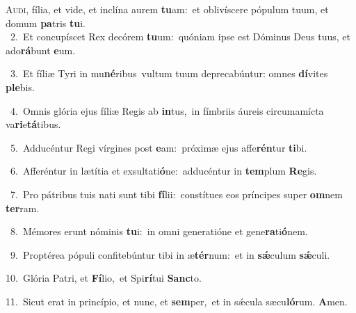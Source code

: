 \lettrine{\initial\textcolor{\initialcolor}{A}}{udi,} fília, et vide, et inclína aurem \textbf{tu}\-am:~\star et oblivíscere pópulum tuum, et domum \textbf{pa}\-tris \textbf{tu}\-i.\\
{\numbfont\textcolor{\numbcolor}{~2.}}~Et concupíscet Rex decórem \textbf{tu}\-um:~\star quóniam ipse est Dóminus Deus tuus, et ado\-\textbf{rá}\-bunt \textbf{e}\-um.\par
{\numbfont\textcolor{\numbcolor}{~3.}}~Et fíliæ Tyri in mu\-\textbf{né}\-ribus~\star vultum tuum deprecabúntur: omnes \textbf{dí}\-vites \textbf{ple}\-bis.\par
{\numbfont\textcolor{\numbcolor}{~4.}}~Omnis glória ejus fíliæ Regis ab \textbf{in}\-tus,~\star in fímbriis áureis circumamícta va\-\textbf{ri}\-e\-\textbf{tá}\-tibus.\par
{\numbfont\textcolor{\numbcolor}{~5.}}~Adducéntur Regi vírgines post \textbf{e}\-am:~\star próximæ ejus affe\-\textbf{rén}\-tur \textbf{ti}\-bi.\par
{\numbfont\textcolor{\numbcolor}{~6.}}~Afferéntur in lætítia et exsultati\-\textbf{ó}\-ne:~\star adducéntur in \textbf{tem}\-plum \textbf{Re}\-gis.\par
{\numbfont\textcolor{\numbcolor}{~7.}}~Pro pátribus tuis nati sunt tibi \textbf{fí}\-lii:~\star constítues eos príncipes super \textbf{om}\-nem \textbf{ter}\-ram.\par
{\numbfont\textcolor{\numbcolor}{~8.}}~Mémores erunt nóminis \textbf{tu}\-i:~\star in omni generatióne et gene\-\textbf{ra}\-ti\-\textbf{ó}\-nem.\par
{\numbfont\textcolor{\numbcolor}{~9.}}~Proptérea pópuli confitebúntur tibi in æ\-\textbf{tér}\-num:~\star et in \textbf{sǽ}\-culum \textbf{sǽ}\-culi.\par
{\numbfont\textcolor{\numbcolor}{10.}}~Glória Patri, et \textbf{Fí}\-lio,~\star et Spi\-\textbf{rí}\-tui \textbf{Sanc}\-to.\par
{\numbfont\textcolor{\numbcolor}{11.}}~Sicut erat in princípio, et nunc, et \textbf{sem}\-per,~\star et in sǽcula sæcu\-\textbf{ló}\-rum. \textbf{A}\-men.\par
